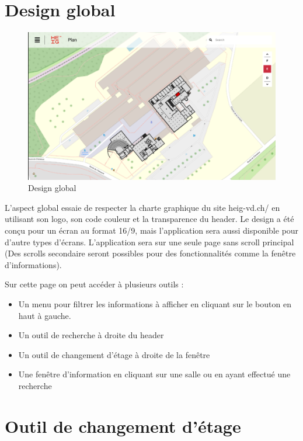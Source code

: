 \documentclass[
    iai, %
    il, %
]{heig-tb}
\begin{document}
\section{Design global}

\begin{figure}[H]
    \caption{Design global}
    \centering
    \includegraphics[scale=0.4]{designGlobal.png}
\end{figure}

L'aspect global essaie de respecter la charte graphique du site heig-vd.ch/ en utilisant son logo, son code couleur et la transparence du header.
Le design a été conçu pour un écran au format 16/9, mais l'application sera aussi disponible pour d'autre types d'écrans.
L'application sera sur une seule page sans scroll principal
(Des scrolls secondaire seront possibles pour des fonctionnalités comme la fenêtre d'informations).

Sur cette page on peut accéder à plusieurs outils :

\begin{itemize}
    \item Un menu pour filtrer les informations à afficher en cliquant sur le bouton en haut à gauche.
    \item Un outil de recherche à droite du header
    \item Un outil de changement d'étage à droite de la fenêtre
    \item Une fenêtre d'information en cliquant sur une salle ou en ayant effectué une recherche
\end{itemize}

\section{Outil de changement d'étage}
\end{document}
